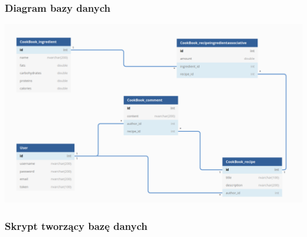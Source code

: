 \documentclass[11pt]{article}
\begin{document}
\subsubsection{Diagram bazy danych}
\includegraphics[width=15.5cm]{db_diagram.png}
\subsubsection{Skrypt tworzący bazę danych}

\end{document}
